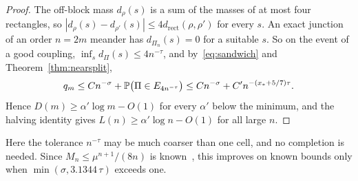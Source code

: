 \begin{proof}
The off-block mass $d_\rho(s)$ is a sum of the masses of at most four rectangles, so
$|d_\rho(s)-d_{\rho'}(s)|\le4d_{\mathrm{rect}}(\rho,\rho')$ for every $s$. An exact junction of an order
$n=2m$ meander has $d_{\Pi_n}(s)=0$ for a suitable $s$. So on the event of a good coupling,
$\inf_sd_\Pi(s)\le4n^{-\tau}$, and by~\eqref{eq:sandwich} and Theorem~\ref{thm:nearsplit},
\[
q_m\le Cn^{-\sigma}+\mathbb{P}\bigl(\Pi\in E_{4n^{-\tau}}\bigr)\le Cn^{-\sigma}+C'n^{-(x_*+5/7)\tau}.
\]
Hence $D(m)\ge\alpha'\log m-O(1)$ for every $\alpha'$ below the minimum, and the halving identity
gives $L(n)\ge\alpha'\log n-O(1)$ for all large $n$.
\end{proof}

Here the tolerance $n^{-\tau}$ may be much coarser than one cell, and no completion is needed. Since
$M_n\le\mu^{n+1}/(8n)$ is known~\cite{PaperC}, this improves on known bounds only when
$\min(\sigma,3.1344\,\tau)$ exceeds one.
